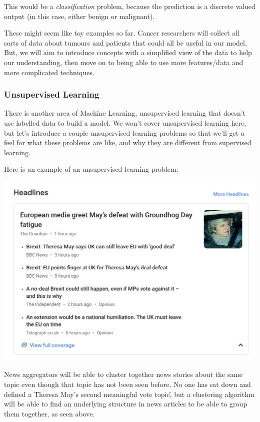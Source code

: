 \documentclass[12pt]{article}
\begin{document}
This would be a \textit{classification} problem, because the prediction is a discrete valued output (in this case, either benign or malignant). 

These might seem like toy examples so far. Cancer researchers will collect all sorts of data about tumours and patients that could all be useful in our model. But, we will aim to introduce concepts with a simplified view of the data to help our understanding, then move on to being able to use more features/data and more complicated techniques.

\subsubsection{Unsupervised Learning}

There is another area of Machine Learning, unsupervised learning that doesn't use labelled data to build a model. We won't cover unsupervised learning here, but let's introduce a couple unsupervised learning problems so that we'll get a feel for what these problems are like, and why they are different from supervised learning.

Here is an example of an unsupervised learning problem:

\includegraphics[width={\textwidth}]{google-news}

News aggregators will be able to cluster together news stories about the same topic even though that topic has not been seen before. No one has sat down and defined a \"Theresa May's second meaningful vote topic\", but a clustering algorithm will be able to find an underlying structure in news articles to be able to group them together, as seen above. 
\end{document}
